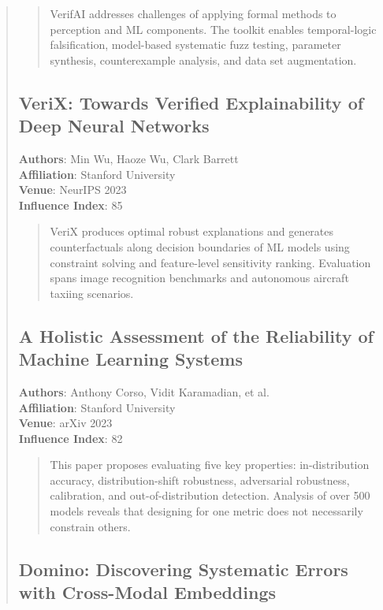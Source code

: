 \documentclass[12pt,a4paper]{article}
\begin{document}
\begin{abstract}
\begin{abstract}
VerifAI addresses challenges of applying formal methods to perception and ML components. The toolkit enables temporal-logic falsification, model-based systematic fuzz testing, parameter synthesis, counterexample analysis, and data set augmentation.
\end{abstract}

\subsection{VeriX: Towards Verified Explainability of Deep Neural Networks}

\textbf{Authors}: Min Wu, Haoze Wu, Clark Barrett \\
\textbf{Affiliation}: Stanford University \\
\textbf{Venue}: NeurIPS 2023 \\
\textbf{Influence Index}: 85

\begin{abstract}
VeriX produces optimal robust explanations and generates counterfactuals along decision boundaries of ML models using constraint solving and feature-level sensitivity ranking. Evaluation spans image recognition benchmarks and autonomous aircraft taxiing scenarios.
\end{abstract}

\subsection{A Holistic Assessment of the Reliability of Machine Learning Systems}

\textbf{Authors}: Anthony Corso, Vidit Karamadian, et al. \\
\textbf{Affiliation}: Stanford University \\
\textbf{Venue}: arXiv 2023 \\
\textbf{Influence Index}: 82

\begin{abstract}
This paper proposes evaluating five key properties: in-distribution accuracy, distribution-shift robustness, adversarial robustness, calibration, and out-of-distribution detection. Analysis of over 500 models reveals that designing for one metric does not necessarily constrain others.
\end{abstract}

\subsection{Domino: Discovering Systematic Errors with Cross-Modal Embeddings}


\end{abstract}
\end{document}
